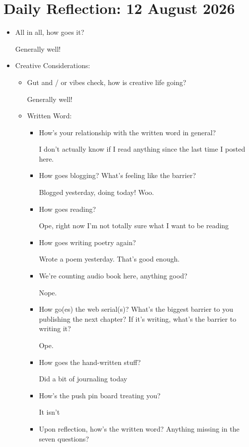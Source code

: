 \documentclass[12pt]{article}
\renewcommand{\,}{\textsuperscript{,}}
\newcommand{\dailyreflect}[1]{\section{Daily Reflection: #1}}
\begin{document}
\dailyreflect{12 August 2026}  
\begin{itemize}  
 \item All in all, how goes it?

Generally well!

 \item Creative Considerations:  
 \begin{itemize}  
 \item Gut and / or vibes check, how is creative life going?

Generally well!

 \item Written Word:  
 \begin{itemize}  
 \item How's your relationship with the written word in general?

I don't actually know if I read anything since the last time I posted here.

\item How goes blogging? What's feeling like the barrier?

Blogged yesterday, doing today! Woo.

\item How goes reading?

Ope, right now I'm not totally sure what I want to be reading

\item How goes writing poetry again?

Wrote a poem yesterday. That's good enough.

\item We're counting audio book here, anything good?

Nope.

\item How go(es) the web serial(s)? What's the biggest barrier to you publishing the next chapter? If it's writing, what's the barrier to writing it?

Ope.

\item How goes the hand-written stuff?

Did a bit of journaling today

\item How's the push pin board treating you?

It isn't

\item Upon reflection, how's the written word? Anything missing in the seven questions?


\end{itemize}
\end{itemize}
\end{itemize}
\end{document}

